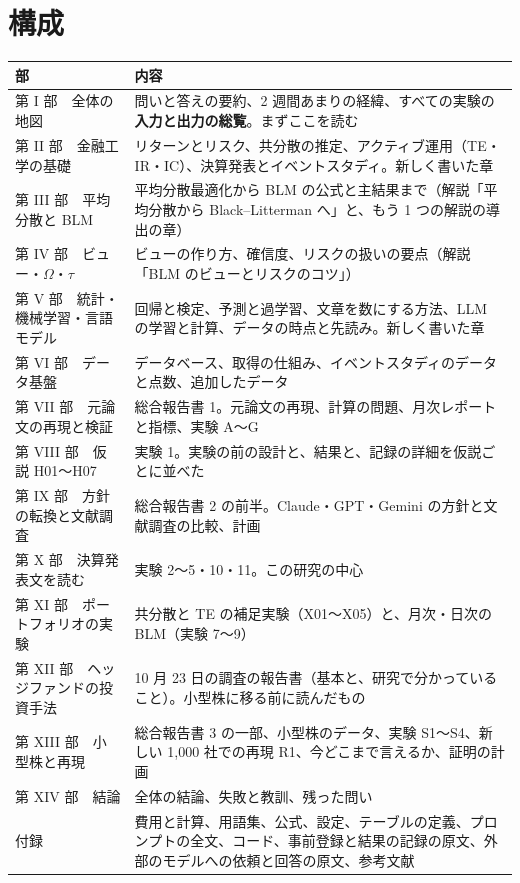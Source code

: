 \section*{構成}

\begin{longtable}{P{3.8cm}P{11.0cm}}
\toprule
\textbf{部} & \textbf{内容} \\
\midrule
\endhead
\bottomrule
\endfoot
第 I 部　全体の地図 & 問いと答えの要約、2 週間あまりの経緯、すべての実験の\textbf{入力と出力の総覧}。まずここを読む \\
第 II 部　金融工学の基礎 & リターンとリスク、共分散の推定、アクティブ運用（TE・IR・IC）、決算発表とイベントスタディ。新しく書いた章 \\
第 III 部　平均分散と BLM & 平均分散最適化から BLM の公式と主結果まで（解説「平均分散から Black--Litterman へ」と、もう 1 つの解説の導出の章） \\
第 IV 部　ビュー・$\Omega$・$\tau$ & ビューの作り方、確信度、リスクの扱いの要点（解説「BLM のビューとリスクのコツ」） \\
第 V 部　統計・機械学習・言語モデル & 回帰と検定、予測と過学習、文章を数にする方法、LLM の学習と計算、データの時点と先読み。新しく書いた章 \\
第 VI 部　データ基盤 & データベース、取得の仕組み、イベントスタディのデータと点数、追加したデータ \\
第 VII 部　元論文の再現と検証 & 総合報告書 1。元論文の再現、計算の問題、月次レポートと指標、実験 A〜G \\
第 VIII 部　仮説 H01〜H07 & 実験 1。実験の前の設計と、結果と、記録の詳細を仮説ごとに並べた \\
第 IX 部　方針の転換と文献調査 & 総合報告書 2 の前半。Claude・GPT・Gemini の方針と文献調査の比較、計画 \\
第 X 部　決算発表文を読む & 実験 2〜5・10・11。この研究の中心 \\
第 XI 部　ポートフォリオの実験 & 共分散と TE の補足実験（X01〜X05）と、月次・日次の BLM（実験 7〜9） \\
第 XII 部　ヘッジファンドの投資手法 & 10 月 23 日の調査の報告書（基本と、研究で分かっていること）。小型株に移る前に読んだもの \\
第 XIII 部　小型株と再現 & 総合報告書 3 の一部、小型株のデータ、実験 S1〜S4、新しい 1,000 社での再現 R1、今どこまで言えるか、証明の計画 \\
第 XIV 部　結論 & 全体の結論、失敗と教訓、残った問い \\
付録 & 費用と計算、用語集、公式、設定、テーブルの定義、プロンプトの全文、コード、事前登録と結果の記録の原文、外部のモデルへの依頼と回答の原文、参考文献 \\
\end{longtable}

